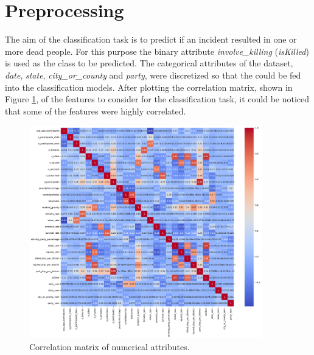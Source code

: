 \documentclass[10pt,a4paper]{report}
\begin{document}
\section{Preprocessing}

The aim of the classification task is to predict if an incident resulted in one or more dead people.
For this purpose the binary attribute \textit{involve\_killing} (\textit{isKilled}) is used as the class to be predicted.
The categorical attributes of the dataset, \textit{date}, \textit{state}, \textit{city\_or\_county} and \textit{party}, were discretized so that the could be fed into the classification models.
After plotting the correlation matrix, shown in Figure \ref{corr_matrix_class}, of the features to consider for the classification task, it could be noticed that some of the features were highly correlated.

\begin{figure}[b!]
	\includegraphics[width=0.9\textwidth]{corr_matrix_class}
	\centering
	\caption{Correlation matrix of numerical attributes.}
	\label{corr_matrix_class}
\end{figure}
\end{document}
